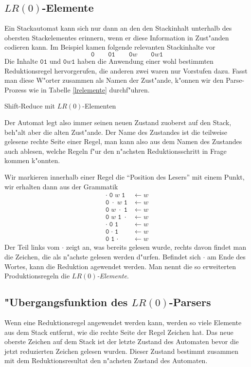 \subsection{\texorpdfstring{$LR(0)$}{LR(0)}-Elemente}
Ein Stackautomat kann sich nur dann an den den Stackinhalt unterhalb des obersten
Stackelementes erinnern, wenn er diese Information in Zust"anden codieren kann.
Im Beispiel kamen folgende relevanten Stackinhalte vor 
\[
\texttt{0}
\qquad
\texttt{01}
\qquad
\texttt{0}w
\qquad
\texttt{0}w\texttt{1}
\]
Die Inhalte $\texttt{01}$ und $\texttt{0}w\texttt{1}$ haben die Anwendung einer wohl bestimmten
Reduktionsregel
hervorgerufen, die anderen zwei waren nur Vorstufen dazu.
Fasst man diese W"orter
zusammen als Namen der Zust"ande, k"onnen wir den Parse-Prozess wie in
Tabelle \ref{lrelemente} durchf"uhren.
\begin{table}[H]

\caption{Shift-Reduce mit $LR(0)$-Elementen\label{lrelemente}}
\end{table}
Der Automat legt also immer seinen neuen Zustand zuoberst auf den
Stack, beh"alt aber die alten Zust"ande. Der Name des Zustandes ist
die teilweise gelesene rechte Seite einer Regel, man kann also aus
dem Namen des Zustandes auch ablesen, welche Regeln f"ur den n"achsten
Reduktionsschritt in Frage kommen k"onnten.

Wir markieren innerhalb einer Regel die ``Position des Lesers'' mit
einem Punkt, wir erhalten dann aus der Grammatik
\begin{align}
\cdot\;\texttt{0}\;w\;\texttt{1}&\leftarrow w\tag{1}\\
\texttt{0}\;\cdot\;w\;\texttt{1}&\leftarrow w\tag{1}\\
\texttt{0}\;w\;\cdot\;\texttt{1}&\leftarrow w\tag{1}\\
\texttt{0}\;w\;\texttt{1}\;\cdot&\leftarrow w\tag{1}\\
\cdot\;\texttt{0}\;\texttt{1}&\leftarrow w\tag{2}\\
\texttt{0}\;\cdot\;\texttt{1}&\leftarrow w\tag{2}\\
\texttt{0}\;\texttt{1}\;\cdot&\leftarrow w\tag{2}
\end{align}
Der Teil links vom $\cdot$ zeigt an, was bereits gelesen wurde,
rechts davon findet
man die Zeichen, die als n"achste gelesen werden d"urfen.
Befindet sich $\cdot$
am Ende des Wortes, kann die Reduktion agewendet werden.
Man nennt die so erweiterten
Produktionsregeln die {\em $LR(0)$-Elemente}.

\subsection{"Ubergangsfunktion des \texorpdfstring{$LR(0)$}{LR(0)}-Parsers}
Wenn eine Reduktionsregel angewendet werden kann, werden so viele Elemente
aus dem Stack entfernt, wie die rechte Seite der Regel Zeichen hat. Das
neue oberste Zeichen auf dem Stack ist der letzte Zustand des Automaten
bevor die jetzt reduzierten Zeichen gelesen wurden. Dieser Zustand
bestimmt zusammen mit dem Reduktionsresultat den n"achsten Zustand
des Automaten.

